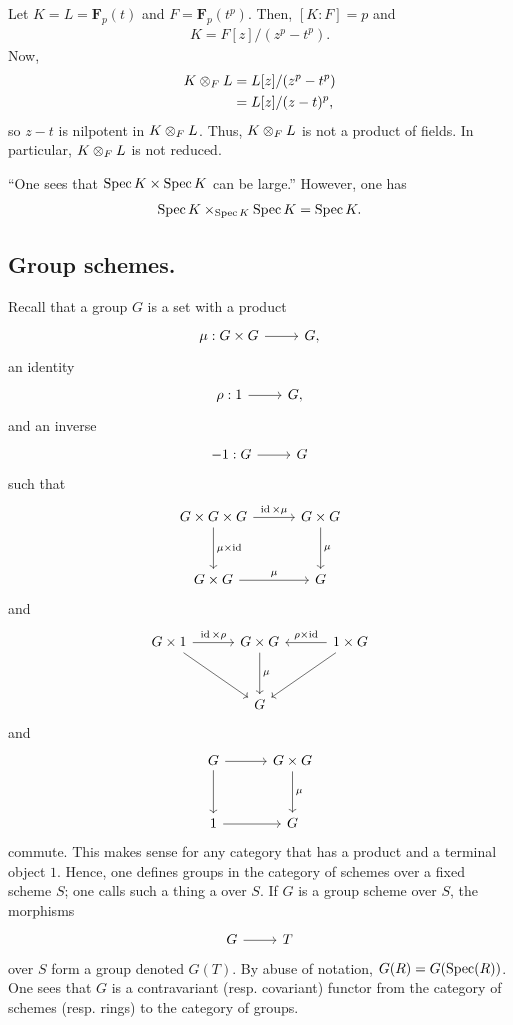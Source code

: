 \documentclass [11 pt, oneside] {article}
\begin{document}
\begin{example}\label{}\text{}
Let $K=L= \mathbf{F}_{p}(t)$ and $F = \mathbf{F}_{p}(t^p)$. Then, $[K:F] = p$ and 
\begin{align*}
	K = F[z] /(z^p - t^p).
\end{align*}
Now, 
\begin{align*}
	K\otimes _FL &= L[z]/(z^p-t^p)\\&= L[z]/ (z-t)^p,
\end{align*}
so $z-t$ is nilpotent in $K\otimes _F L$. Thus, $K\otimes _F L$ is not a product of fields. In particular, $K\otimes_F L$ is not reduced.
\end{example}
\begin{remark}
	``One sees that $\operatorname{Spec} K\times \operatorname{Spec} K$ can be large.'' However, one has
	\begin{align*}
		\operatorname{Spec} K\times_{\operatorname{Spec} K} \operatorname{Spec} K = \operatorname{Spec} K.
	\end{align*}
\end{remark}

\subsection{Group schemes.}
Recall that a group $G$ is a set with a product 
\[
\begin{tikzcd}
\mu:G\times G\ar[r]&G,
\end{tikzcd}
\]
an identity 
\[
\begin{tikzcd}
\rho : 1\ar[r]& G,
\end{tikzcd}
\]
and an inverse 
\[
\begin{tikzcd}
-1 :G\ar[r]& G
\end{tikzcd}
\] 
such that
\[
\begin{tikzcd}[column sep = 3 em, row sep = 3 em]
	G\times G \times G \ar[r, "\id\times \mu"] \ar[d, "\mu\times \id"] & G\times G\ar[d,"\mu"]\\
	G\times G \ar[r,"\mu"] & G
\end{tikzcd}
\]
and
\[
\begin{tikzcd}[column sep = 3 em, row sep = 3 em]
	G\times 1 \ar[r, "\id\times \rho"]\ar[dr] &G\times G\ar[d, "\mu"]& 1\times G \ar[l, "\rho\times \id", swap] \ar[dl]\\
						  & G
\end{tikzcd}
\]
and
\[
\begin{tikzcd}[column sep = 3 em, row sep = 3 em]
	G\ar[r] \ar[d] & G\times G\ar[d,"\mu"]\\
	1\ar[r] & G
\end{tikzcd}
\]
commute. This makes sense for any category that has a product and a terminal object $1$. 
Hence, one defines groups in the category of schemes over a fixed scheme $S$; one calls such a thing a  over $S$. If $G$ is a group scheme over $S$, the morphisms 
\[
\begin{tikzcd}
G\ar[r]& T
\end{tikzcd}
\]
over $S$ form a group denoted $G(T)$. By abuse of notation, $G(R) = G(\operatorname{Spec} (R))$.
One sees that $G$ is a contravariant (resp. covariant) functor from the category of schemes (resp. rings) to the category of groups.
\end{document}
